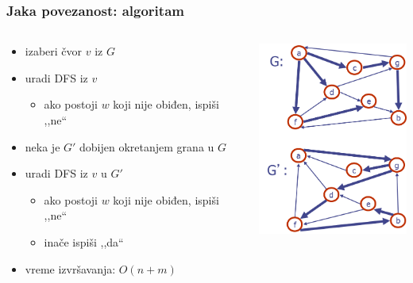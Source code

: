 \documentclass[compress,aspectratio=169]{beamer}
\begin{document}
\begin{frame}[fragile]
  \frametitle{Jaka povezanost: algoritam}
  \begin{columns}
    \begin{column}[t]{6cm}
      \begin{itemize}
        \item izaberi čvor $v$ iz $G$
        \item uradi DFS iz $v$
        \begin{itemize}
          \item ako postoji $w$ koji nije obiđen, ispiši ,,ne``
        \end{itemize}
        \item neka je $G'$ dobijen okretanjem grana u $G$
        \item uradi DFS iz $v$ u $G'$
        \begin{itemize}
          \item ako postoji $w$ koji nije obiđen, ispiši ,,ne``
          \item inače ispiši ,,da``
        \end{itemize}
        \item vreme izvršavanja: $O(n+m)$
      \end{itemize}
    \end{column}
    \begin{column}[t]{6cm}
      \begin{center}
        \includegraphics[width=5cm]{asp-14-pic33.png}
      \end{center}
    \end{column}
  \end{columns}
\end{frame}
\end{document}
